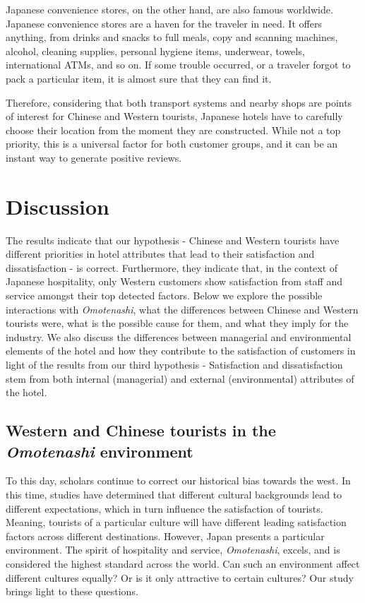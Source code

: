 \documentclass[smallextended,natbib]{svjour3}       %
\begin{document}
    Japanese convenience stores, on the other hand, are also famous worldwide. Japanese convenience stores are a haven for the traveler in need. It offers anything, from drinks and snacks to full meals, copy and scanning machines, alcohol, cleaning supplies, personal hygiene items, underwear, towels, international ATMs, and so on. If some trouble occurred, or a traveler forgot to pack a particular item, it is almost sure that they can find it.

    Therefore, considering that both transport systems and nearby shops are points of interest for Chinese and Western tourists, Japanese hotels have to carefully choose their location from the moment they are constructed. While not a top priority, this is a universal factor for both customer groups, and it can be an instant way to generate positive reviews.



\section{Discussion}\label{discussion}

  The results indicate that our hypothesis - Chinese and Western tourists have different priorities in hotel attributes that lead to their satisfaction and dissatisfaction - is correct. Furthermore, they indicate that, in the context of Japanese hospitality, only Western customers show satisfaction from staff and service amongst their top detected factors. Below we explore the possible interactions with \textit{Omotenashi}, what the differences between Chinese and Western tourists were, what is the possible cause for them, and what they imply for the industry. We also discuss the differences between managerial and environmental elements of the hotel and how they contribute to the satisfaction of customers in light of the results from our third hypothesis - Satisfaction and dissatisfaction stem from both internal (managerial) and external (environmental) attributes of the hotel.

  \subsection{Western and Chinese tourists in the \textit{Omotenashi} environment}\label{disc:omotenashi}

    To this day, scholars continue to correct our historical bias towards the west. In this time, studies have determined that different cultural backgrounds lead to different expectations, which in turn influence the satisfaction of tourists. Meaning, tourists of a particular culture will have different leading satisfaction factors across different destinations. However, Japan presents a particular environment. The spirit of hospitality and service, \textit{Omotenashi}, excels, and is considered the highest standard across the world. Can such an environment affect different cultures equally? Or is it only attractive to certain cultures? Our study brings light to these questions. 
\end{document}
